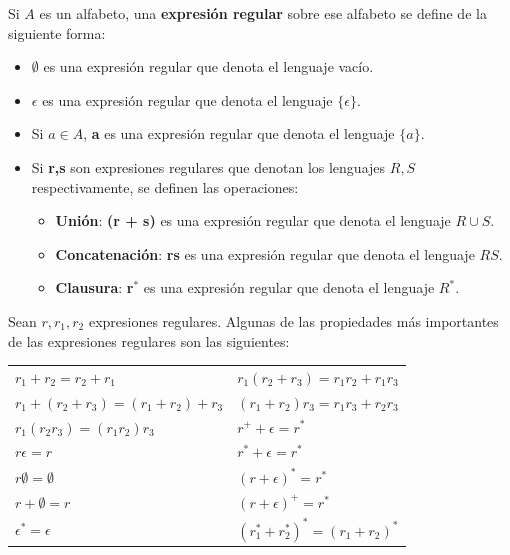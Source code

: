 Si $A$ es un alfabeto, una \textbf{expresión regular} sobre ese alfabeto se define de la siguiente forma:

\begin{itemize}
    \item $\emptyset$ es una expresión regular que denota el lenguaje vacío.
    \item $\epsilon$ es una expresión regular que denota el lenguaje $\lbrace \epsilon \rbrace$.
    \item Si $a \in A$, \textbf{a} es una expresión regular que denota el lenguaje $\lbrace a \rbrace$.
    \item Si \textbf{r,s} son expresiones regulares que denotan los lenguajes $R,S$ respectivamente, se definen las operaciones:
    \begin{itemize}
        \item \textbf{Unión}: \textbf{(r + s)} es una expresión regular que denota el lenguaje $R \cup S$.
        \item \textbf{Concatenación}: \textbf{rs} es una expresión regular que denota el lenguaje $RS$.
        \item \textbf{Clausura}: \textbf{r$^*$} es una expresión regular que denota el lenguaje $R^*$.
    \end{itemize}
\end{itemize}

Sean $r,r_1,r_2$ expresiones regulares. Algunas de las propiedades más importantes de las expresiones regulares son las siguientes:
\vspace{0.5cm}
\newline
\begin{tabular}{ll}
    $r_1 + r_2 = r_2 + r_1$ & $r_1(r_2+r_3) = r_1r_2 + r_1r_3$ \\
    $r_1 + (r_2 + r_3) = (r_1 + r_2) + r_3$ & $(r_1+r_2)r_3 = r_1r_3 + r_2r_3$ \\
    $r_1(r_2r_3) = (r_1r_2)r_3$ & $r^+ + \epsilon = r^*$ \\
    $r\epsilon = r$ & $r^* + \epsilon = r^*$ \\
    $r\emptyset = \emptyset$ & $(r+\epsilon)^* = r^*$ \\
    $r+\emptyset = r$ & $(r+\epsilon)^+ = r^*$ \\
    $\epsilon^* = \epsilon$ & $(r_1^*+r_2^*)^* = (r_1+r_2)^*$ \\
\end{tabular}
\vspace{0.5cm}

